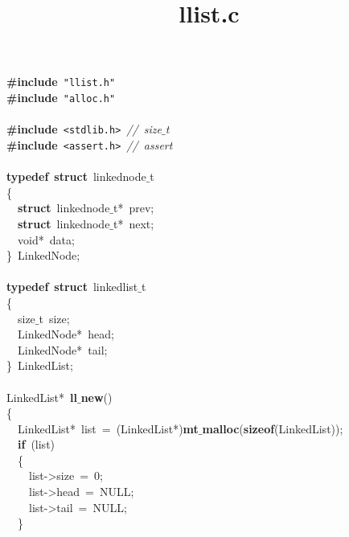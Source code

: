 \documentclass{article}
\title{llist.c}
\date{}
\begin{document}
\maketitle

\noindent
\mbox{}\textbf{\#include}\ \texttt{"{}llist.h"{}} \\
\mbox{}\textbf{\#include}\ \texttt{"{}alloc.h"{}} \\
\mbox{} \\
\mbox{}\textbf{\#include}\ \texttt{\textless{}stdlib.h\textgreater{}}\ \textit{//\ size$\_$t} \\
\mbox{}\textbf{\#include}\ \texttt{\textless{}assert.h\textgreater{}}\ \textit{//\ assert} \\
\mbox{} \\
\mbox{}\textbf{typedef}\ \textbf{struct}\ linkednode$\_$t \\
\mbox{}\{ \\
\mbox{}\ \ \textbf{struct}\ linkednode$\_$t*\ prev; \\
\mbox{}\ \ \textbf{struct}\ linkednode$\_$t*\ next; \\
\mbox{}\ \ void*\ data; \\
\mbox{}\}\ LinkedNode; \\
\mbox{} \\
\mbox{}\textbf{typedef}\ \textbf{struct}\ linkedlist$\_$t \\
\mbox{}\{ \\
\mbox{}\ \ size$\_$t\ size; \\
\mbox{}\ \ LinkedNode*\ head; \\
\mbox{}\ \ LinkedNode*\ tail; \\
\mbox{}\}\ LinkedList; \\
\mbox{} \\
\mbox{}LinkedList*\ \textbf{ll$\_$new}() \\
\mbox{}\{ \\
\mbox{}\ \ LinkedList*\ list\ =\ (LinkedList*)\textbf{mt$\_$malloc}(\textbf{sizeof}(LinkedList)); \\
\mbox{}\ \ \textbf{if}\ (list) \\
\mbox{}\ \ \{ \\
\mbox{}\ \ \ \ list-\textgreater{}size\ =\ 0; \\
\mbox{}\ \ \ \ list-\textgreater{}head\ =\ NULL; \\
\mbox{}\ \ \ \ list-\textgreater{}tail\ =\ NULL; \\
\mbox{}\ \ \} \\
\end{document}
